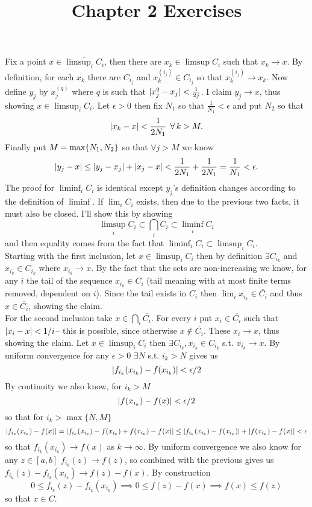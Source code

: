 \documentclass{article}
\title{Chapter 2 Exercises}
\newenvironment{ex}[1]
  {\renewcommand\theexercise{#1}\exercise}
  {\endexercise}
\begin{document}
\begin{ex}{2.3}
  Fix a point $x \in \overline{\limsup_i C_i}$, then there are $x_k \in \limsup C_i$ such that $x_k \to x$. By definition, for each $x_k$ there are $C_{i_j}$ and $x_k^{(i_j)} \in C_{i_j}$ so that $x_k^{(i_j)} \to x_k$. Now define $y_j$ by $x_j^(q)$ where $q$ is such that $\lvert x_j^q - x_j\rvert < \frac{1}{2j}$. I claim $y_j \to x$, thus showing $x \in \limsup_i C_i$. Let $\epsilon > 0$ then fix $N_1$ so that $\frac{1}{N_1} < \epsilon$ and put $N_2$ so that
  $$
  \abs{x_k - x} < \frac{1}{2N_1} \, \forall k > M.
  $$
  Finally put $M = \max\{N_1, N_2\}$ so that $\forall j > M$ we know
  $$
  \lvert y_j - x\rvert \le \lvert y_j - x_j\rvert + \lvert x_j - x\rvert < \frac{1}{2N_1} + \frac{1}{2N_1} = \frac{1}{N_1} < \epsilon.
  $$
  The proof for $\liminf_i C_i$ is identical except $y_j$'s definition changes according to the definition of $\liminf$. If $\lim_i C_i$ exists, then due to the previous two facts, it must also be closed.
\end{ex}
\begin{ex}{2.4}
  I'll show this by showing
  $$
  \limsup_i C_i \subset \bigcap_i \overline{C_i} \subset \liminf_i C_i
  $$
  and then equality comes from the fact that $\liminf_i C_i \subset \limsup_i C_i$.
  \,\\
  Starting with the first inclusion, let $x \in \limsup_i C_i$ then by definition $\exists C_{i_k}$ and $x_{i_k} \in C_{i_k}$ where $x_{i_k} \to x$. By the fact that the sets are non-increasing we know, for any $i$ the tail of the sequence $x_{i_k} \in C_i$ (tail meaning with at most finite terms removed, dependent on $i$). Since the tail exists in $C_i$ then $\lim_i x_{i_k} \in \overline{C_i}$ and thus $x \in \overline{C_i}$, showing the claim.
  \, \\
  For the second inclusion take $x \in \bigcap_i \overline{C_i}$. For every $i$ put $x_i \in \overline{C_i}$ such that $\lvert x_i - x\rvert < 1/i$-- this is possible, since otherwise $x \not\in \overline{C_i}$. These $x_i \to x$, thus showing the claim.
\end{ex}
\begin{ex}{2.5}
  Let $x \in \limsup_i C_i$ then $\exists C_{i_k}, x_{i_k} \in C_{i_k}$ s.t. $x_{i_k} \to x$. By uniform convergence for any $\epsilon > 0$ $\exists N$ s.t. $i_k > N$ gives us
  $$
  \lvert f_{i_k}(x_{i_k}) - f(x_{i_k})\rvert < \epsilon / 2
  $$
  By continuity we also know, for $i_k > M$
  $$
  \lvert f(x_{i_k}) - f(x)\rvert < \epsilon / 2
  $$
  so that for $i_k > \max\{N,M\}$
  $$
  \lvert f_{i_k}(x_{i_k}) - f(x)\rvert = \lvert f_{i_k}(x_{i_k}) - f(x_{i_k}) + f(x_{i_k}) - f(x)\rvert \le \lvert f_{i_k}(x_{i_k}) - f(x_{i_k})\rvert + \lvert f(x_{i_k}) - f(x)\rvert < \epsilon
  $$
  so that $f_{i_k}(x_{i_k}) \to f(x)$ as $k \to \infty$. By uniform convergence we also know for any $z \in [a, b]$ $f_{i_k}(z) \to f(z)$, so combined with the previous gives us $f_{i_k}(z) - f_{i_k}(x_{i_k}) \to f(z) - f(x)$. By construction
  $$
  0 \le f_{i_k}(z) - f_{i_k}(x_{i_k}) \implies 0 \le f(z) - f(x) \implies f(x) \le f(z)
  $$
  so that $x \in C$.
\end{ex}
\end{document}
